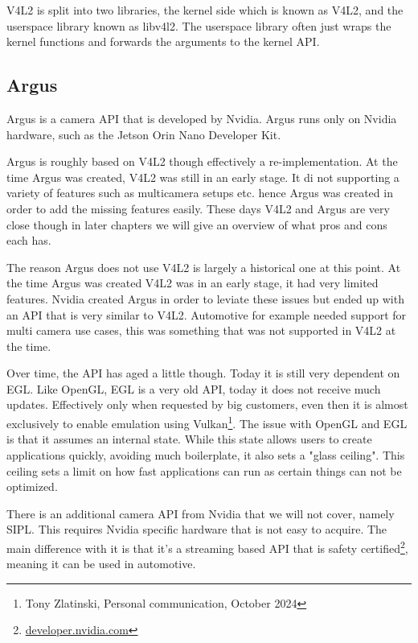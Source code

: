 V4L2 is split into two libraries, the kernel side which is known as V4L2, and the
userspace library known as libv4l2. The userspace library often just wraps the
kernel functions and forwards the arguments to the kernel API.

\subsection{Argus}

Argus is a camera API that is developed by Nvidia. Argus runs only on Nvidia
hardware, such as the Jetson Orin Nano Developer Kit.

Argus is roughly based on V4L2 though effectively a re-implementation. At the
time Argus was created, V4L2 was still in an early stage. It di not supporting
a variety of features such as multicamera setups etc. hence Argus was created
in order to add the missing features easily. These days V4L2 and Argus are very
close though in later chapters we will give an overview of what pros and cons
each has.

The reason Argus does not use V4L2 is largely a historical one at this point.
At the time Argus was created V4L2 was in an early stage, it had very limited
features. Nvidia created Argus in order to leviate these issues but ended up
with an API that is very similar to V4L2. Automotive for example needed support
for multi camera use cases, this was something that was not supported in V4L2 at
the time.

Over time, the API has aged a little though. Today it is still very dependent
on EGL. Like OpenGL, EGL is a very old API, today it does not receive much
updates. Effectively only when requested by big customers, even then it is
almost exclusively to enable emulation using Vulkan\footnote{Tony Zlatinski,
Personal communication, October 2024}. The issue with OpenGL and EGL is that it
assumes an internal state. While this state allows users to create applications
quickly, avoiding much boilerplate, it also sets a "glass ceiling". This
ceiling sets a limit on how fast applications can run as certain things can not
be optimized.

There is an additional camera API from Nvidia that we will not cover, namely
SIPL. This requires Nvidia specific hardware that is not easy to acquire. The
main difference with it is that it's a streaming based API that is safety
certified\footnote{\href{https://developer.nvidia.com/docs/drive/drive-os/6.0.8.1/public/drive-os-linux-sdk/common/topics/nvmedia\_concept\_nvsipl/PlatformCameraConfiguration.html}{developer.nvidia.com}},
meaning it can be used in automotive.

